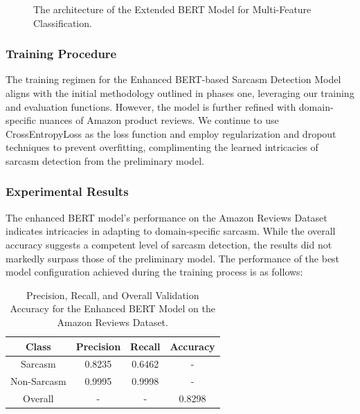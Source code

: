 \documentclass[10pt,twocolumn,letterpaper]{article}
\begin{document}
\begin{figure}[ht]
    \centering
    \caption{The architecture of the Extended BERT Model for Multi-Feature Classification.}
    \label{fig:model_architecture}
\end{figure}

\subsubsection{Training Procedure}
The training regimen for the Enhanced BERT-based Sarcasm Detection Model aligns with the initial methodology outlined in phases one, leveraging our training and evaluation functions. However, the model is further refined with domain-specific nuances of Amazon product reviews. We continue to use CrossEntropyLoss as the loss function and employ regularization and dropout techniques to prevent overfitting, complimenting the learned intricacies of sarcasm detection from the preliminary model.

\subsubsection{Experimental Results}
\label{sec:experimental_results}

The enhanced BERT model's performance on the Amazon Reviews Dataset indicates intricacies in adapting to domain-specific sarcasm. While the overall accuracy suggests a competent level of sarcasm detection, the results did not markedly surpass those of the preliminary model. The performance of the best model configuration achieved during the training process is as follows:

\begin{table}[H]  
    \centering  
    \begin{tabular}{|c|c|c|c|}  
        \hline  
        Class & Precision & Recall & Accuracy \\  
        \hline  
        Sarcasm & 0.8235 & 0.6462 & - \\  
        \hline  
        Non-Sarcasm & 0.9995 & 0.9998 & - \\  
        \hline  
        Overall & - & - & 0.8298 \\  
        \hline  
    \end{tabular}  
    \caption{Precision, Recall, and Overall Validation Accuracy for the Enhanced BERT Model on the Amazon Reviews Dataset.}  
    \label{tab:best_model_results}
\end{table}
\end{document}
